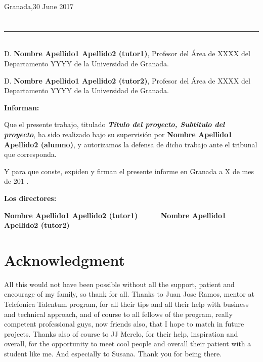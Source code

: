 \begin{flushright}
Granada,30 June 2017
\end{flushright}


\chapter*{}
\thispagestyle{empty}

\noindent\rule[-1ex]{\textwidth}{2pt}\\[4.5ex]

D. \textbf{Nombre Apellido1 Apellido2 (tutor1)}, Profesor del Área de XXXX del Departamento YYYY de la Universidad de Granada.

\vspace{0.5cm}

D. \textbf{Nombre Apellido1 Apellido2 (tutor2)}, Profesor del Área de XXXX del Departamento YYYY de la Universidad de Granada.


\vspace{0.5cm}

\textbf{Informan:}

\vspace{0.5cm}

Que el presente trabajo, titulado \textit{\textbf{Título del proyecto, Subtítulo del proyecto}},
ha sido realizado bajo su supervisión por \textbf{Nombre Apellido1 Apellido2 (alumno)}, y autorizamos la defensa de dicho trabajo ante el tribunal
que corresponda.

\vspace{0.5cm}

Y para que conste, expiden y firman el presente informe en Granada a X de mes de 201 .

\vspace{1cm}

\textbf{Los directores:}

\vspace{5cm}

\noindent \textbf{Nombre Apellido1 Apellido2 (tutor1) \ \ \ \ \ Nombre Apellido1 Apellido2 (tutor2)}

\chapter*{Acknowledgment}
\thispagestyle{empty}

       \vspace{1cm}


All this would not have been possible without all the support, patient and
encourage of my family, so thank for all.
\intro
Thanks to Juan Jose Ramos, mentor at Telefonica Talentum program, for all their
tips and all their help with business and technical approach, and of course to
all fellows of the program, really competent professional guys,  now friends also,
that I hope to match in future projects.
\intro
Thanks also of course to JJ Merelo, for their help, inspiration and overall, for
the opportunity to meet cool people and overall their patient with a student
like me.
\intro
And especially to Susana. Thank you for being there.
